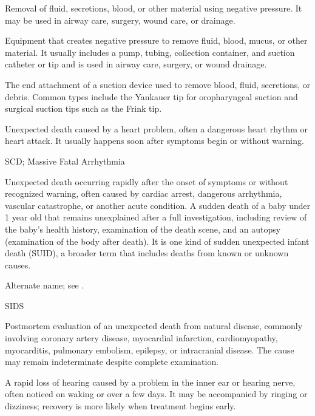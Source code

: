  Removal of fluid, secretions, blood, or other material using negative pressure. It may be used in airway care, surgery, wound care, or drainage.

 Equipment that creates negative pressure to remove fluid, blood, mucus, or other material. It usually includes a pump, tubing, collection container, and suction catheter or tip and is used in airway care, surgery, or wound drainage.

 The end attachment of a suction device used to remove blood, fluid, secretions, or debris.
Common types include the Yankauer tip for oropharyngeal suction and surgical suction tips such as the Frink tip.

 Unexpected death caused by a heart problem, often a dangerous heart rhythm or heart attack. It usually happens soon after symptoms begin or without warning.

\synonyms
SCD; Massive Fatal Arrhythmia

 Unexpected death occurring rapidly after the onset of symptoms or without recognized warning, often caused by cardiac arrest, dangerous arrhythmia, vascular catastrophe, or another acute condition.
 A sudden death of a baby under 1 year old that remains unexplained after a full investigation, including review of the baby's health history, examination of the death scene, and an autopsy (examination of the body after death). It is one kind of sudden unexpected infant death (SUID), a broader term that includes deaths from known or unknown causes.

 Alternate name; see .

\synonyms
SIDS

 Postmortem evaluation of an unexpected death from natural disease, commonly involving coronary artery disease, myocardial infarction, cardiomyopathy, myocarditis, pulmonary embolism, epilepsy, or intracranial disease. The cause may remain indeterminate despite complete examination.

 A rapid loss of hearing caused by a problem in the inner ear or hearing nerve, often noticed on waking or over a few days. It may be accompanied by ringing or dizziness; recovery is more likely when treatment begins early.

